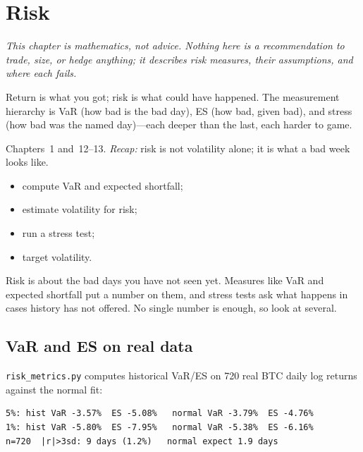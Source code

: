 \chapter{Risk}\label{ch:risk}

\noindent\emph{This chapter is mathematics, not advice. Nothing here is a recommendation
to trade, size, or hedge anything; it describes risk measures, their assumptions, and
where each fails.}

\vspace{1em}
\noindent Return is what you got; risk is what could have happened. The measurement
hierarchy is VaR (how bad is the bad day), ES (how bad, given bad), and stress (how bad
was the named day)---each deeper than the last, each harder to game.

\begin{rulebox}
Chapters~1 and~12--13. \emph{Recap:} risk is not volatility alone; it is what a bad week looks like.
\end{rulebox}
\begin{wins}
\begin{itemize}
\item compute VaR and expected shortfall;
\item estimate volatility for risk;
\item run a stress test;
\item target volatility.
\end{itemize}
\end{wins}
\begin{principle}
Risk is about the bad days you have not seen yet. Measures like VaR and expected shortfall put a number on them, and stress tests ask what happens in cases history has not offered. No single number is enough, so look at several.
\end{principle}

\section{VaR and ES on real data}\label{sec:var}

\texttt{risk\_metrics.py} computes historical VaR/ES on 720 real BTC daily log returns
against the normal fit:
\begin{lstlisting}[numbers=none]
5%: hist VaR -3.57%  ES -5.08%   normal VaR -3.79%  ES -4.76%
1%: hist VaR -5.80%  ES -7.95%   normal VaR -5.38%  ES -6.16%
n=720  |r|>3sd: 9 days (1.2%)   normal expect 1.9 days
\end{lstlisting}

